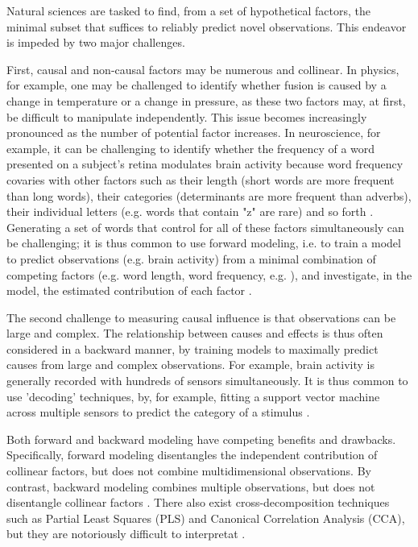 Natural sciences are tasked to find, from a set of hypothetical factors, the minimal subset that suffices to reliably predict novel observations. This endeavor is impeded by two major challenges.

First, causal and non-causal factors may be numerous and collinear. In physics, for example, one may be challenged to identify whether fusion is caused by a change in temperature or a change in pressure, as these two factors may, at first, be difficult to manipulate independently. This issue becomes increasingly pronounced as the number of potential factor increases. In neuroscience, for example, it can be challenging to identify whether the frequency of a word presented on a subject's retina modulates brain activity because word frequency covaries with other factors such as their length (short words are more frequent than long words), their categories (determinants are more frequent than adverbs), their individual letters (e.g. words that contain "z" are rare) and so forth \citep{kutas2011thirty,pegado2014timing}. Generating a set of words that control for all of these factors simultaneously can be challenging; it is thus common to use forward modeling, i.e. to train a model to predict observations (e.g. brain activity) from a minimal combination of competing factors (e.g. word length, word frequency, e.g. \citep{huth2016natural}), and investigate, in the model, the estimated contribution of each factor \citep{friston1994statistical}.

The second challenge to measuring causal influence is that observations can be large and complex. The relationship between causes and effects is thus often considered in a backward manner, by training models to maximally predict causes from large and complex observations. For example, brain activity is generally recorded with hundreds of sensors simultaneously. It is thus common to use 'decoding' techniques, by, for example, fitting a support vector machine across multiple sensors to predict the category of a stimulus \citep{cichy2014resolving, king2016brain, kriegeskorte2008representational, norman2006beyond}.

Both forward and backward modeling have competing benefits and drawbacks. Specifically, forward modeling disentangles the independent contribution of collinear factors, but does not combine multidimensional observations. By contrast, backward modeling combines multiple observations, but does not disentangle collinear factors \cite{weichwald2015causal, hebart2018deconstructing, king2018encoding}. There also exist cross-decomposition techniques such as Partial Least Squares (PLS) and Canonical Correlation Analysis (CCA), but they are notoriously difficult to interpretat \citep{lebart1995statistique}.

